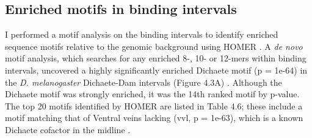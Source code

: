 \subsection{Enriched motifs in binding intervals}
I performed a motif analysis on the binding intervals to identify enriched sequence motifs relative to the genomic background using HOMER \citep{heinz_simple_2010}. A \emph{de novo} motif analysis, which searches for any enriched 8-, 10- or 12-mers within binding intervals, uncovered a highly significantly enriched Dichaete motif (p = 1e-64) in the \emph{D. melanogaster} Dichaete-Dam intervals (Figure 4.3A) \citep{aleksic_role_2013}. Although the Dichaete motif was strongly enriched, it was the 14th ranked motif by p-value. The top 20 motifs identified by HOMER are listed in Table 4.6; these include a motif matching that of Ventral veins lacking (vvl, p = 1e-63), which is a known Dichaete cofactor in the midline \citep{aleksic_role_2013,soriano_drosophila_1998}.\\

